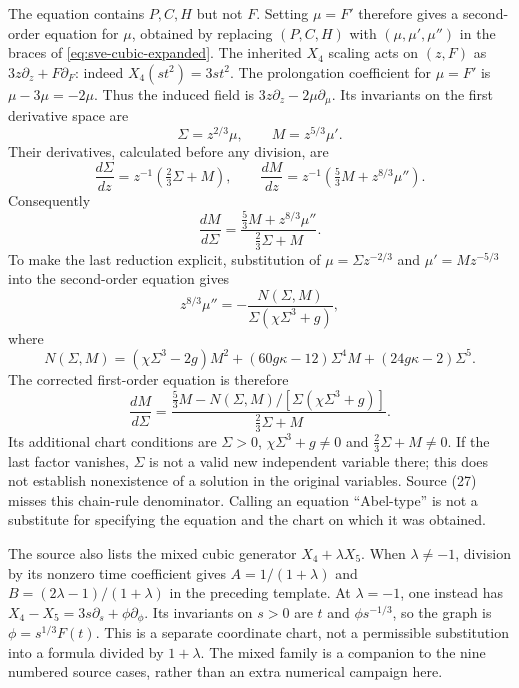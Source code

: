 The equation contains $P,C,H$ but not $F$. Setting $\mu=F'$ therefore
gives a second-order equation for $\mu$, obtained by replacing
$(P,C,H)$ with $(\mu,\mu',\mu'')$ in the braces of
\eqref{eq:sve-cubic-expanded}. The inherited $X_4$ scaling acts on
$(z,F)$ as $3z\partial_z+F\partial_F$: indeed $X_4(st^2)=3st^2$.
The prolongation coefficient for $\mu=F'$ is $\mu-3\mu=-2\mu$.
Thus the induced field is $3z\partial_z-2\mu\partial_\mu$.
Its invariants on the first derivative space are
\[
 \Sigma=z^{2/3}\mu,\qquad M=z^{5/3}\mu'.
\]
Their derivatives, calculated before any division, are
\[
 \frac{d\Sigma}{dz}=z^{-1}(\tfrac23\Sigma+M),\qquad
 \frac{dM}{dz}=z^{-1}(\tfrac53M+z^{8/3}\mu'').
\]
Consequently
\begin{equation}
 \frac{dM}{d\Sigma}=
 \frac{\tfrac53M+z^{8/3}\mu''}{\tfrac23\Sigma+M}.
 \label{eq:sve-repro-mu}
\end{equation}
To make the last reduction explicit, substitution of
$\mu=\Sigma z^{-2/3}$ and $\mu'=Mz^{-5/3}$ into the second-order
equation gives
\[
 z^{8/3}\mu''=-\frac{N(\Sigma,M)}{\Sigma(\chi\Sigma^3+g)},
\]
where
\[
 N(\Sigma,M)=(\chi\Sigma^3-2g)M^2
       +(60g\kappa-12)\Sigma^4M+(24g\kappa-2)\Sigma^5.
\]
The corrected first-order equation is therefore
\begin{equation}
 \frac{dM}{d\Sigma}=
 \frac{\tfrac53M-N(\Sigma,M)/[\Sigma(\chi\Sigma^3+g)]}
      {\tfrac23\Sigma+M}.
 \label{eq:sve-cubic-first-order}
\end{equation}
Its additional chart conditions are $\Sigma>0$,
$\chi\Sigma^3+g\ne0$ and $\tfrac23\Sigma+M\ne0$.
If the last factor vanishes, $\Sigma$ is not a valid new independent
variable there; this does not establish nonexistence of a solution in the
original variables. Source (27) misses this chain-rule denominator.
Calling an equation ``Abel-type'' is not a substitute for specifying the
equation and the chart on which it was obtained.

The source also lists the mixed cubic generator $X_4+\lambda X_5$.
When $\lambda\ne-1$, division by its nonzero time coefficient gives
$A=1/(1+\lambda)$ and $B=(2\lambda-1)/(1+\lambda)$ in the preceding
template. At $\lambda=-1$, one instead has
$X_4-X_5=3s\partial_s+\phi\partial_\phi$. Its invariants on $s>0$
are $t$ and $\phi s^{-1/3}$, so the graph is $\phi=s^{1/3}F(t)$.
This is a separate coordinate chart, not a permissible substitution into
a formula divided by $1+\lambda$. The mixed family is a companion to the
nine numbered source cases, rather than an extra numerical campaign here.

